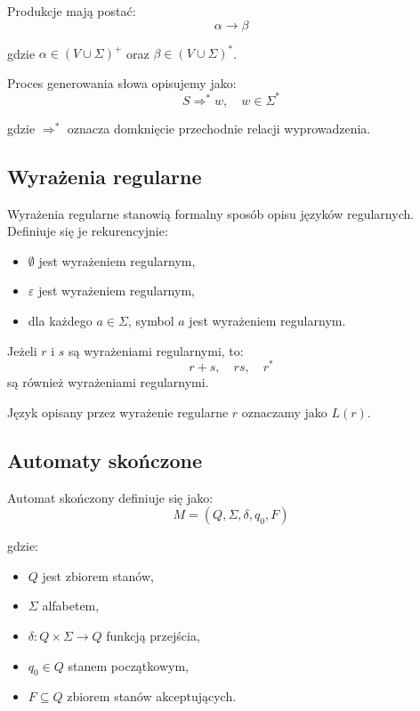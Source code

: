 \documentclass[12pt]{article}
\begin{document}
Produkcje mają postać:
\begin{equation}
\alpha \rightarrow \beta
\end{equation}

gdzie $\alpha \in (V \cup \Sigma)^+$ oraz $\beta \in (V \cup \Sigma)^*$.

Proces generowania słowa opisujemy jako:
\begin{equation}
S \Rightarrow^* w, \quad w \in \Sigma^*
\end{equation}

gdzie $\Rightarrow^*$ oznacza domknięcie przechodnie relacji wyprowadzenia.

\subsection{Wyrażenia regularne}

Wyrażenia regularne stanowią formalny sposób opisu języków regularnych. Definiuje się je rekurencyjnie:
\begin{itemize}
    \item $\emptyset$ jest wyrażeniem regularnym,
    \item $\varepsilon$ jest wyrażeniem regularnym,
    \item dla każdego $a \in \Sigma$, symbol $a$ jest wyrażeniem regularnym.
\end{itemize}

Jeżeli $r$ i $s$ są wyrażeniami regularnymi, to:
\begin{equation}
r + s, \quad rs, \quad r^*
\end{equation}
są również wyrażeniami regularnymi.

Język opisany przez wyrażenie regularne $r$ oznaczamy jako $L(r)$.

\subsection{Automaty skończone}

Automat skończony definiuje się jako:
\begin{equation}
M = (Q, \Sigma, \delta, q_0, F)
\end{equation}

gdzie:
\begin{itemize}
    \item $Q$ jest zbiorem stanów,
    \item $\Sigma$ alfabetem,
    \item $\delta: Q \times \Sigma \rightarrow Q$ funkcją przejścia,
    \item $q_0 \in Q$ stanem początkowym,
    \item $F \subseteq Q$ zbiorem stanów akceptujących.
\end{itemize}
\end{document}
